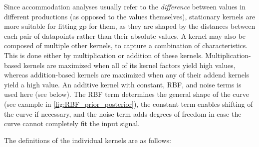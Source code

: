 Since accommodation analyses usually refer to the \textit{difference} between values in different productions (as opposed to the values themselves), stationary kernels are more suitable for fitting \ac{gp} for them, as they are shaped by the distances between each pair of datapoints rather than their absolute values.
A kernel may also be composed of multiple other kernels, to capture a combination of characteristics.
This is done either by multiplication or addition of these kernels.
Multiplication-based kernels are maximized when all of its kernel factors yield high values, whereas
addition-based kernels are maximized when any of their addend kernels yield a high value.
An additive kernel with constant, RBF, and noise terms is used here (see  below).
The RBF term determines the general shape of the curve (see example in \cref{fig:RBF_prior_posterior}), the constant term enables shifting of the curve if necessary, and the noise term adds degrees of freedom in case the curve cannot completely fit the input signal.

The definitions of the individual kernels are as follows:

